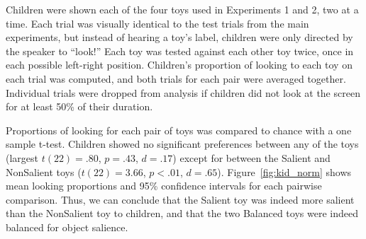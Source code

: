 \documentclass[man,floatsintext]{apa6}
\begin{document}
Children were shown each of the four toys used in Experiments 1 and 2, two at a time. Each trial was visually identical to the test trials from the main experiments, but instead of hearing a toy's label, children were only directed by the speaker to ``look!'' Each toy was tested against each other toy twice, once in each possible left-right position. Children's proportion of looking to each toy on each trial was computed, and both trials for each pair were averaged together. Individual trials were dropped from analysis if children did not look at the screen for at least 50\% of their duration.

Proportions of looking for each pair of toys was compared to chance with a one sample t-test. Children showed no significant preferences between any of the toys (largest $t(22) = .80$, $p = .43$, $d =.17$) except for between the Salient and NonSalient toys ($t(22) = 3.66$, $p < .01$, $d =.65$). Figure~\ref{fig:kid_norm} shows mean looking proportions and 95\% confidence intervals for each pairwise comparison. Thus, we can conclude that the Salient toy was indeed more salient than the NonSalient toy to children, and that the two Balanced toys were indeed balanced for object salience.
%



\end{document}
